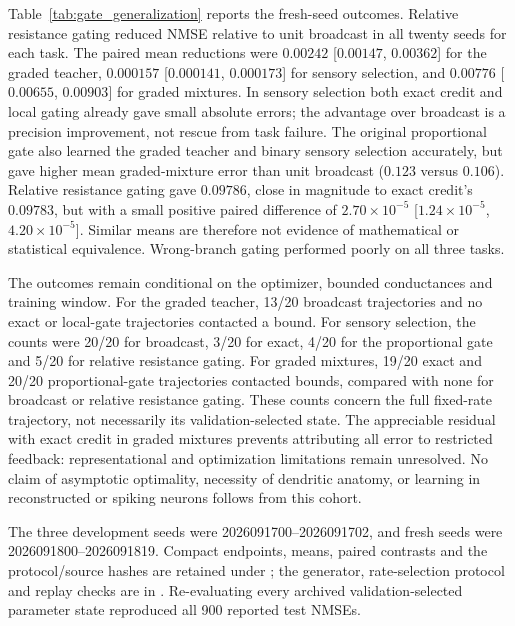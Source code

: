 Table~\ref{tab:gate_generalization} reports the fresh-seed outcomes. Relative
resistance gating reduced NMSE relative to unit broadcast in all twenty seeds
for each task. The paired mean reductions were $0.00242$
[$0.00147$, $0.00362$] for the graded teacher, $0.000157$
[$0.000141$, $0.000173$] for sensory selection, and $0.00776$
[$0.00655$, $0.00903$] for graded mixtures. In sensory selection both exact
credit and local gating already gave small absolute errors; the advantage
over broadcast is a precision improvement, not rescue from task failure.
The original proportional gate also learned the graded teacher and binary
sensory selection accurately, but gave higher mean graded-mixture error than
unit broadcast ($0.123$ versus $0.106$). Relative resistance gating gave
$0.09786$, close in magnitude to exact credit's $0.09783$, but with a small
positive paired difference of $2.70\times10^{-5}$
[$1.24\times10^{-5}$, $4.20\times10^{-5}$]. Similar means are therefore not
evidence of mathematical or statistical equivalence. Wrong-branch gating
performed poorly on all three tasks.

The outcomes remain conditional on the optimizer, bounded conductances and
training window. For the graded teacher, 13/20 broadcast trajectories and no
exact or local-gate trajectories contacted a bound. For sensory selection,
the counts were 20/20 for broadcast, 3/20 for exact, 4/20 for the proportional
gate and 5/20 for relative resistance gating. For graded mixtures, 19/20
exact and 20/20 proportional-gate trajectories contacted bounds, compared
with none for broadcast or relative resistance gating. These counts concern
the full fixed-rate trajectory, not necessarily its validation-selected state.
The appreciable residual with exact credit in graded mixtures prevents
attributing all error to restricted feedback: representational and
optimization limitations remain unresolved. No claim of asymptotic optimality,
necessity of dendritic anatomy, or learning in reconstructed or spiking neurons
follows from this cohort.

The three development seeds were 2026091700--2026091702, and fresh seeds were
2026091800--2026091819. Compact endpoints, means, paired contrasts and the
protocol/source hashes are retained under
; the generator,
rate-selection protocol and replay checks are in
. Re-evaluating every archived
validation-selected parameter state reproduced all 900 reported test NMSEs.
